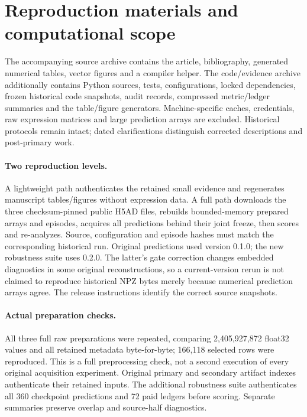 \section{Reproduction materials and computational scope}
\label{app:reproduction}
The accompanying source archive contains the article, bibliography, generated numerical tables, vector figures and a compiler helper. The code/evidence archive additionally contains Python sources, tests, configurations, locked dependencies, frozen historical code snapshots, audit records, compressed metric/ledger summaries and the table/figure generators. Machine-specific caches, credentials, raw expression matrices and large prediction arrays are excluded. Historical protocols remain intact; dated clarifications distinguish corrected descriptions and post-primary work.

\paragraph{Two reproduction levels.} A lightweight path authenticates the retained small evidence and regenerates manuscript tables/figures without expression data. A full path downloads the three checksum-pinned public H5AD files, rebuilds bounded-memory prepared arrays and episodes, acquires all predictions behind their joint freeze, then scores and re-analyzes. Source, configuration and episode hashes must match the corresponding historical run. Original predictions used version 0.1.0; the new robustness suite uses 0.2.0. The latter's gate correction changes embedded diagnostics in some original reconstructions, so a current-version rerun is not claimed to reproduce historical NPZ bytes merely because numerical prediction arrays agree. The release instructions identify the correct source snapshots.

\paragraph{Actual preparation checks.} All three full raw preparations were repeated, comparing 2,405,927,872 float32 values and all retained metadata byte-for-byte; 166,118 selected rows were reproduced. This is a full preprocessing check, not a second execution of every original acquisition experiment. Original primary and secondary artifact indexes authenticate their retained inputs. The additional robustness suite authenticates all 360 checkpoint predictions and 72 paid ledgers before scoring. Separate summaries preserve overlap and source-half diagnostics.

